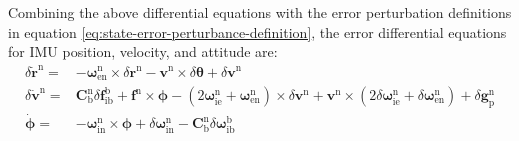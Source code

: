 \documentclass{article}
\begin{document}
Combining the above differential equations with the error perturbation definitions in equation \eqref{eq:state-error-perturbance-definition}, the error differential equations for IMU position, velocity, and attitude are:
\begin{equation}
    \begin{aligned}
        \delta \dot{\boldsymbol{r}}^{\mathrm{n}} =& -\boldsymbol{\omega }_{\mathrm{en}}^{\mathrm{n}}\times \delta \boldsymbol{r}^{\mathrm{n}}- \boldsymbol{v}^{\mathrm{n}} \times \delta \boldsymbol{\theta} +\delta \boldsymbol{v}^{\mathrm{n}} \\ 
        \delta \dot{\boldsymbol{v}}^{\mathrm{n}} =& \mathbf{C}_{\mathrm{b}}^{\mathrm{n}}\delta \boldsymbol{f}_{\mathrm{ib}}^{\mathrm{b}}+\boldsymbol{f}^{\mathrm{n}}\times \boldsymbol{\phi }-(2\boldsymbol{\omega }_{\mathrm{ie}}^{\mathrm{n}}+\boldsymbol{\omega }_{\mathrm{en}}^{\mathrm{n}})\times \delta \boldsymbol{v}^{\mathrm{n}}+\boldsymbol{v}^{\mathrm{n}}\times (2\delta \boldsymbol{\omega }_{\mathrm{ie}}^{\mathrm{n}}+\delta \boldsymbol{\omega }_{\mathrm{en}}^{\mathrm{n}})+\delta \boldsymbol{g}_{\mathrm{p}}^{\mathrm{n}} \\
        \dot{\boldsymbol{\phi}} =& - \boldsymbol{\omega}_{\mathrm{in}}^{\mathrm{n}} \times {\boldsymbol{\phi}} +\delta\boldsymbol{\omega}_{\mathrm{in}}^{\mathrm{n}}-\mathbf{C}_{\mathrm{b}}^{\mathrm{n}}\delta\boldsymbol{\omega}_{\mathrm{ib}}^{\mathrm{b}}
    \end{aligned}
    \label{eq:navigation-state-error-difference-equations}
\end{equation}
\end{document}
